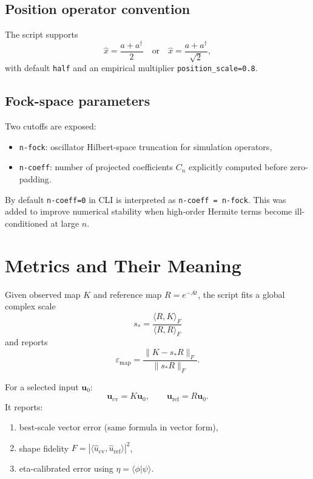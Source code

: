 \documentclass[11pt]{article}
\begin{document}
\subsection{Position operator convention}
The script supports
\begin{equation}
\hat{x}=\frac{a+a^\dagger}{2}
\quad\text{or}\quad
\hat{x}=\frac{a+a^\dagger}{\sqrt{2}},
\end{equation}
with default \texttt{half} and an empirical multiplier
\texttt{position\_scale=0.8}.

\subsection{Fock-space parameters}
Two cutoffs are exposed:
\begin{itemize}[itemsep=2pt]
  \item \texttt{n-fock}: oscillator Hilbert-space truncation for simulation operators,
  \item \texttt{n-coeff}: number of projected coefficients $C_n$ explicitly computed before zero-padding.
\end{itemize}
By default \texttt{n-coeff=0} in CLI is interpreted as
\texttt{n-coeff = n-fock}. This was added to improve numerical stability when
high-order Hermite terms become ill-conditioned at large $n$.

\section{Metrics and Their Meaning}
Given observed map $K$ and reference map $R=e^{-At}$, the script fits a global
complex scale
\begin{equation}
s_* = \frac{\langle R,K\rangle_F}{\langle R,R\rangle_F}
\end{equation}
and reports
\begin{equation}
\varepsilon_{\mathrm{map}}=\frac{\|K-s_*R\|_F}{\|s_*R\|_F}.
\end{equation}

For a selected input $\mathbf{u}_0$:
\begin{equation}
\mathbf{u}_{\mathrm{cv}}=K\mathbf{u}_0,
\qquad
\mathbf{u}_{\mathrm{ref}}=R\mathbf{u}_0.
\end{equation}
It reports:
\begin{enumerate}[itemsep=2pt]
  \item best-scale vector error (same formula in vector form),
  \item shape fidelity
  $F=|\langle\hat{u}_{\mathrm{cv}},\hat{u}_{\mathrm{ref}}\rangle|^2$,
  \item eta-calibrated error using $\eta=\langle\phi|\psi\rangle$.
\end{enumerate}
\end{document}
